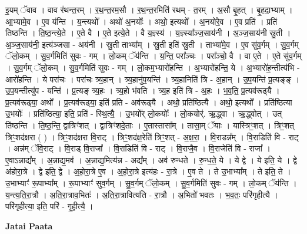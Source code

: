 \documentclass[17pt]{extarticle}
\begin{document}
इ॒यम् ॅवाव । वाव र॑थन्त॒रम् । र॒थ॒न्त॒रम॒सौ । र॒थ॒न्त॒रमिति॑ रथम् - त॒रम् । अ॒सौ बृ॒हत् । बृ॒हदा॒भ्याम् । आ॒भ्यामे॒व । ए॒व य॑न्ति । य॒न्त्यथो᳚ । अथो॑ अ॒नयोः᳚ । अथो॒ इत्यथो᳚ । अ॒नयो॑रे॒व । ए॒व प्रति॑ । प्रति॑ तिष्ठन्ति । ति॒ष्ठ॒न्त्ये॒ते । ए॒ते वै । ए॒ते इत्ये॒ते । वै य॒ज्ञ्स्य॑ । य॒ज्ञ्स्या᳚ञ्ज॒साय॑नी । अ॒ञ्ज॒साय॑नी स्रु॒ती । अ॒ञ्ज॒साय॑नी॒ इत्य॑ञ्जसा - अय॑नी । स्रु॒ती ताभ्या᳚म् । स्रु॒ती इति॑ स्रु॒ती । ताभ्या॑मे॒व । ए॒व सु॑व॒र्गम् । सु॒व॒र्गम् ॅलो॒कम् । सु॒व॒र्गमिति॑ सुवः - गम् । लो॒कम् ॅय॑न्ति । य॒न्ति॒ परा᳚ञ्चः । परा᳚ञ्चो॒ वै । वा ए॒ते । ए॒ते सु॑व॒र्गम् । सु॒व॒र्गम् ॅलो॒कम् । सु॒व॒र्गमिति॑ सुवः - गम् । लो॒कम॒भ्यारो॑हन्ति । अ॒भ्यारो॑हन्ति॒ ये । अ॒भ्यारो॑ह॒न्तीत्य॑भि - आरो॑हन्ति । ये परा॑चः । परा॑चः त्र्य॒हान् । त्र्य॒हानु॑प॒यन्ति॑ । त्र्य॒हानिति॑ त्रि - अ॒हान् । उ॒प॒यन्ति॑ प्र॒त्यङ्‍ङ् । उ॒प॒यन्तीत्यु॑प - यन्ति॑ । प्र॒त्यङ्‍ त्र्य॒हः । त्र्य॒हो भ॑वति । त्र्य॒ह इति॑ त्रि - अ॒हः । भ॒व॒ति॒ प्र॒त्यव॑रूढ्‍यै । प्र॒त्यव॑रूढ्‍या॒ अथो᳚ । प्र॒त्यव॑रूढ्‍या॒ इति॑ प्रति - अव॑रूढ्‍यै । अथो॒ प्रति॑ष्ठित्यै । अथो॒ इत्यथो᳚ । प्रति॑ष्ठित्या उ॒भयोः᳚ । प्रति॑ष्ठित्या॒ इति॒ प्रति॑ - स्थि॒त्यै॒ । उ॒भयो᳚र् लो॒कयोः᳚ । लो॒कयोर्॑. ऋ॒द्ध्वा । ऋ॒द्ध्वोत् । उत् ति॑ष्ठन्ति । ति॒ष्ठ॒न्ति॒ द्वात्रिꣳ॑शत् । द्वात्रिꣳ॑शदे॒ताः । ए॒तास्तासा᳚म् । तासा॒म् ॅयाः । यास्त्रिꣳ॒॒शत् । त्रिꣳ॒॒शत् त्रिꣳ॒॒शद॑क्षरा ( ) । त्रिꣳ॒॒शद॑क्षरा वि॒राट् । त्रिꣳ॒॒शद॑क्ष॒रेति॑ त्रिꣳ॒॒शत् - अ॒क्ष॒रा॒ । वि॒राडन्न᳚म् । वि॒राडिति॑ वि - राट् । अन्न॑म् ॅवि॒राट् । वि॒राड् वि॒राजा᳚ । वि॒राडिति॑ वि - राट् । वि॒राजै॒व । वि॒राजेति॑ वि - राजा᳚ । ए॒वाऽन्नाद्य᳚म् । अ॒न्नाद्य॒मव॑ । अ॒न्नाद्य॒मित्य॑न्न - अद्य᳚म् । अव॑ रुन्धते । रु॒न्ध॒ते॒ ये । ये द्वे । ये इति॒ ये । द्वे अ॑होरा॒त्रे । द्वे इति॒ द्वे । अ॒हो॒रा॒त्रे ए॒व । अ॒हो॒रा॒त्रे इत्य॑हः - रा॒त्रे । ए॒व ते । ते उ॒भाभ्या᳚म् । ते इति॒ ते । उ॒भाभ्याꣳ॑ रू॒पाभ्या᳚म् । रू॒पाभ्याꣳ॑ सुव॒र्गम् । सु॒व॒र्गम् ॅलो॒कम् । सु॒व॒र्गमिति॑ सुवः - गम् । लो॒कम् ॅय॑न्ति । य॒न्त्य॒ति॒रा॒त्रौ । अ॒ति॒रा॒त्राव॒भितः॑ । अ॒ति॒रा॒त्रावित्य॑ति - रा॒त्रौ । अ॒भितो॑ भवतः । भ॒व॒तः॒ परि॑गृहीत्यै । परि॑गृहीत्या॒ इति॒ परि॑ - गृ॒ही॒त्यै॒ । \newline

\textbf{Jatai Paata} \newline
\end{document}
